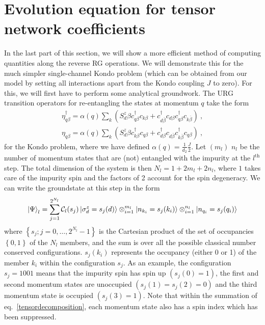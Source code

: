 \documentclass[prb]{revtex4-2}
\begin{document}
\section{Evolution equation for tensor network coefficients}
In the last part of this section, we will show a more efficient method of computing quantities along the reverse RG operations. We will demonstrate this for the much simpler single-channel Kondo problem (which can be obtained from our model by setting all interactions apart from the Kondo coupling \(J\) to zero). For this, we will first have to perform some analytical groundwork. The URG transition operators for re-entangling the states at momentum \(q\) take the form
\begin{equation}\begin{aligned}
	\eta_{q\beta}^\dagger = \alpha(q)\sum_{k} \left( S_d^z \beta c^\dagger_{q\beta}c_{k\beta} + c^\dagger_{d\overline\beta}c_{d\beta}c^\dagger_{q\beta}c_{k\overline\beta}\right) ~,\\
	\eta_{q\beta} = \alpha(q)\sum_{k} \left( S_d^z \beta c^\dagger_{k\beta}c_{q\beta} + c^\dagger_{d\beta}c_{d\overline\beta}c^\dagger_{k\overline\beta}c_{q\beta}\right)~,
\end{aligned}\end{equation}
for the Kondo problem, where we have defined \(\alpha(q) = \frac{1}{d_2}\frac{J}{2}\). Let \((m_l)\) \(n_l\) be the number of momentum states that are (not) entangled with the impurity at the \(l^\text{th}\) step. The total dimension of the system is then \(N_l = 1 + 2m_l + 2n_l\), where \(1\) takes care of the impurity spin and the factors of 2 account for the spin degeneracy. We can write the groundstate at this step in the form
\begin{equation}\begin{aligned}
	\ket{\Psi}_l = \sum_{j=1}^{2^{N_l}} \mathcal{C}_l(s_j)\ket{\sigma^z_d=s_j(d)}\otimes_{i=1}^{m_l}\ket{n_{k_i}=s_j(k_i) }\otimes_{i=1}^{n_l}\ket{n_{q_i}=s_j(q_i)}\label{tensordecomposition}
\end{aligned}\end{equation}
where \(\left\{ s_j; j=0,\ldots,2^{N_l}-1\right\} \) is the Cartesian product of the set of occupancies \(\left\{ 0,1 \right\} \) of the \(N_l\) members, and the sum is over all the possible classical number conserved configurations. \(s_j(k_i)\) represents the occupancy (either 0 or 1) of the member \(k_i\) within the configuration \(s_j\). As an example, the configuration \(s_j = 1001\) means that the impurity spin has spin up \(\left( s_j(0) = 1 \right) \), the first and second momentum states are unoccupied \(\left( s_j(1) = s_j(2) = 0 \right) \) and the third momentum state is occupied \(\left( s_j(3) = 1 \right) \). Note that within the summation of eq.~\ref{tensordecomposition}, each momentum state also has a spin index which has been suppressed.
\end{document}
